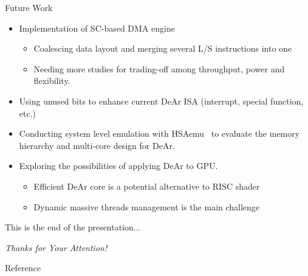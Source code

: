 \documentclass{beamer}
\begin{document}
\begin{CJK}{UTF8}{bkai}
            \begin{frame}{Future Work}
                \begin{itemize}
                    \item <2->{Implementation of SC-based DMA engine
                            \begin{itemize}
                                \item Coalescing data layout and merging several L/S instructions into one
                                \item Needing more studies for trading-off among throughput, power and flexibility. 
                            \end{itemize}
                        }
                    \item <3->{Using unused bits to enhance current DeAr ISA (interrupt, special function, etc.)}
                    \item <4->{Conducting system level emulation with HSAemu~ to evaluate the memory hierarchy and multi-core design for DeAr.}
                    \item <5->{Exploring the possibilities of applying DeAr to GPU.
                            \begin{itemize}
                                \item Efficient DeAr core is a potential alternative to RISC shader
                                \item Dynamic massive threads management is the main challenge
                            \end{itemize}
                        }
                \end{itemize}

            \end{frame}

            \begin{frame}[plain,c]
                \huge{This is the end of the presentation...}
                \begin{center}
                    \Huge{\textit{Thanks for Your Attention!}}
                \end{center}
            \end{frame}

            \begin{frame}[allowframebreaks]{Reference}
                \printbibliography
            \end{frame}


        \end{CJK}
        
\end{document}
